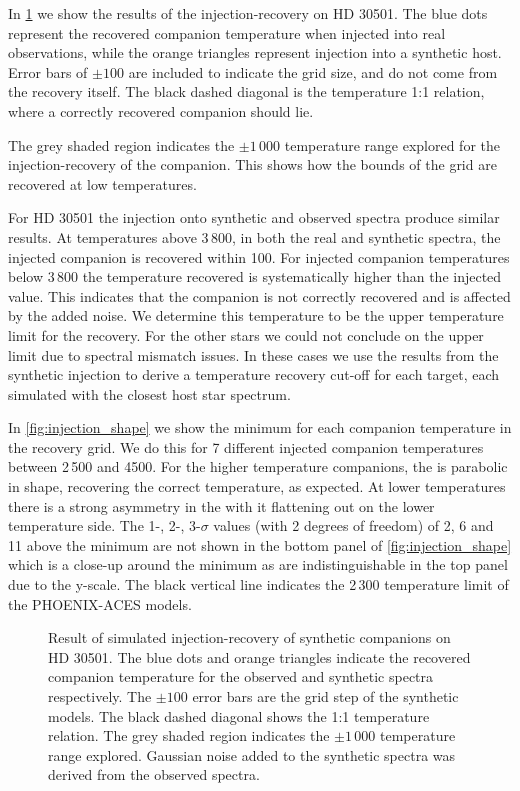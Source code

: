 In \cref{fig:injection-recovery} we show the results of the injection-recovery on {HD 30501}.
The blue dots represent the recovered companion temperature when injected into real observations, while the orange triangles represent injection into a synthetic host.
Error bars of \(\pm100\)\K{} are included to indicate the grid size, and do not come from the recovery itself.
The black dashed diagonal is the temperature 1:1 relation, where a correctly recovered companion should lie.

The grey shaded region indicates the \(\pm1\,000\)\K{} temperature range explored for the injection-recovery of the companion.
This shows how the bounds of the grid are recovered at low temperatures.

For {HD 30501} the injection onto synthetic and observed spectra produce similar results.
At temperatures above 3\,800\K{}, in both the real and synthetic spectra, the injected companion is recovered within 100\K{}.
For injected companion temperatures below 3\,800\K{} the temperature recovered is systematically higher than the injected value.
This indicates that the companion is not correctly recovered and is affected by the added noise.
We determine this temperature to be the upper temperature limit for the recovery.
For the other stars we could not conclude on the upper limit due to spectral mismatch issues.
In these cases we use the results from the synthetic injection to derive a temperature recovery cut-off for each target, each simulated with the closest host star spectrum.

In \cref{fig:injection_shape} we show the minimum \textchisquared{} for each companion temperature in the recovery grid.
We do this for 7 different injected companion temperatures between 2\,500 and 4500\K{}.
For the higher temperature companions, the \textchisquared{} is parabolic in shape, recovering the correct temperature, as expected.
At lower temperatures there is a strong asymmetry in the \textchisquared{} with it flattening out on the lower temperature side.
The 1-, 2-, 3-\(\sigma\) values (with 2 degrees of freedom) of 2, 6 and 11 above the minimum \textchisquared{} are not shown in the bottom panel of \cref{fig:injection_shape} which is a close-up around the minimum \textchisquared{} as are indistinguishable in the top panel due to the \textchisquared{} y-scale.
The black vertical line indicates the 2\,300\K{} temperature limit of the {PHOENIX-ACES} models.

\begin{figure}
    \centering
    \caption{Result of simulated injection-recovery of synthetic companions on {HD 30501}.
The blue dots and orange triangles indicate the recovered companion temperature for the observed and synthetic spectra respectively.
The \(\pm100\)\K{} error bars are the grid step of the synthetic models.
The black dashed diagonal shows the 1:1 temperature relation.
The grey shaded region indicates the \(\pm1\,000\)\K{} temperature range explored.
Gaussian noise added to the synthetic spectra was derived from the observed spectra.}
    \label{fig:injection-recovery}
\end{figure}


